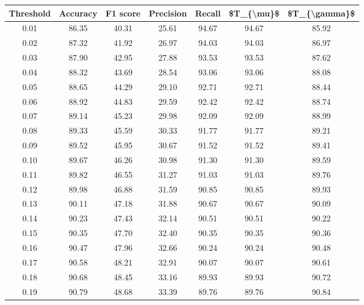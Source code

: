 \begin{tabular}{|c|c|c|c|c|c|c|}
\hline
 Threshold &  Accuracy &  F1 score &  Precision &  Recall &  \$T\_\{\textbackslash mu\}\$ &  \$T\_\{\textbackslash gamma\}\$ \\
\hline
      0.01 &     86.35 &     40.31 &      25.61 &   94.67 &      94.67 &         85.92 \\
      0.02 &     87.32 &     41.92 &      26.97 &   94.03 &      94.03 &         86.97 \\
      0.03 &     87.90 &     42.95 &      27.88 &   93.53 &      93.53 &         87.62 \\
      0.04 &     88.32 &     43.69 &      28.54 &   93.06 &      93.06 &         88.08 \\
      0.05 &     88.65 &     44.29 &      29.10 &   92.71 &      92.71 &         88.44 \\
      0.06 &     88.92 &     44.83 &      29.59 &   92.42 &      92.42 &         88.74 \\
      0.07 &     89.14 &     45.23 &      29.98 &   92.09 &      92.09 &         88.99 \\
      0.08 &     89.33 &     45.59 &      30.33 &   91.77 &      91.77 &         89.21 \\
      0.09 &     89.52 &     45.95 &      30.67 &   91.52 &      91.52 &         89.41 \\
      0.10 &     89.67 &     46.26 &      30.98 &   91.30 &      91.30 &         89.59 \\
      0.11 &     89.82 &     46.55 &      31.27 &   91.03 &      91.03 &         89.76 \\
      0.12 &     89.98 &     46.88 &      31.59 &   90.85 &      90.85 &         89.93 \\
      0.13 &     90.11 &     47.18 &      31.88 &   90.67 &      90.67 &         90.09 \\
      0.14 &     90.23 &     47.43 &      32.14 &   90.51 &      90.51 &         90.22 \\
      0.15 &     90.35 &     47.70 &      32.40 &   90.35 &      90.35 &         90.36 \\
      0.16 &     90.47 &     47.96 &      32.66 &   90.24 &      90.24 &         90.48 \\
      0.17 &     90.58 &     48.21 &      32.91 &   90.07 &      90.07 &         90.61 \\
      0.18 &     90.68 &     48.45 &      33.16 &   89.93 &      89.93 &         90.72 \\
      0.19 &     90.79 &     48.68 &      33.39 &   89.76 &      89.76 &         90.84 \\

\end{tabular}
